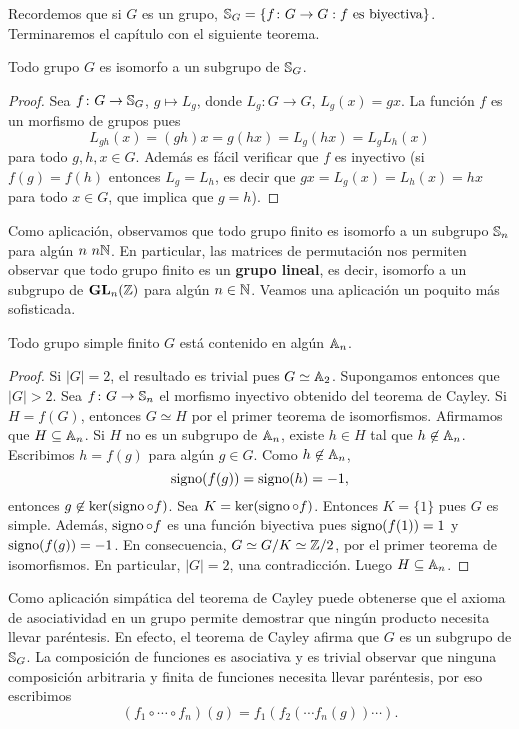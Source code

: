 Recordemos que si $G$ es un grupo, $\mathbb{S}_G=\{f\colon G\to G:f\text{ es biyectiva}\}$. 
Terminaremos el capítulo con el siguiente teorema.

\begin{theorem}[Cayley]
Todo grupo $G$ es isomorfo a un subgrupo de $\mathbb{S}_G$. 
\end{theorem}

\begin{proof}
Sea $f\colon G\to\mathbb{S}_G$, $g\mapsto L_g$, donde $L_g\colon G\to G$, $L_g(x)=gx$. La función $f$ es un morfismo de grupos pues
\[
L_{gh}(x)=(gh)x=g(hx)=L_g(hx)=L_gL_h(x)
\]
para todo $g,h,x\in G$. Además es fácil verificar que $f$ es inyectivo (si $f(g)=f(h)$ entonces $L_g=L_h$, es decir que 
$gx=L_g(x)=L_h(x)=hx$ para todo $x\in G$, que implica que $g=h$). 
\end{proof}

Como aplicación, observamos que todo grupo finito es isomorfo a un subgrupo $\mathbb{S}_n$ para algún $n\ n\mathbb{N}$. En particular, las matrices de permutación nos permiten observar que
todo grupo finito es un \textbf{grupo lineal}, es decir, isomorfo a un subgrupo de $\mathbf{GL}_n(\mathbb{Z})$ para algún $n\in\mathbb{N}$. Veamos una aplicación un poquito más sofisticada.
  
\begin{proposition}
Todo grupo simple finito $G$ está contenido en algún $\mathbb{A}_n$.
\end{proposition}

\begin{proof}
Si $|G|=2$, el resultado es trivial pues $G\simeq\mathbb{A}_2$. Supongamos entonces que $|G|>2$.  
Sea $f\colon G\to\mathbb{S}_n$ el morfismo inyectivo obtenido del teorema de Cayley. Si $H=f(G)$, entonces $G\simeq H$ por el primer teorema de isomorfismos. Afirmamos que $H\subseteq\mathbb{A}_n$. Si   
$H$ no es un subgrupo de $\mathbb{A}_n$, existe $h\in H$ tal que $h\not\in\mathbb{A}_n$. Escribimos $h=f(g)$ para algún $g\in G$. Como $h\not\in\mathbb{A}_n$, 
\[
\operatorname{signo}(f(g))=\operatorname{signo}(h)=-1,
\]
entonces $g\not\in\ker(\operatorname{signo}\circ f)$. 
Sea $K=\ker(\operatorname{signo}\circ f)$. Entonces $K=\{1\}$ pues $G$ es simple. Además, $\operatorname{signo}\circ f$ es una función biyectiva pues $\operatorname{signo}(f(1))=1$ y $\operatorname{signo}(f(g))=-1$. En consecuencia,
$G\simeq G/K\simeq\mathbb{Z}/2$, por el primer teorema de isomorfismos.  En particular, $|G|=2$, una contradicción. Luego $H\subseteq\mathbb{A}_n$.        
\end{proof}	

Como aplicación simpática del teorema de Cayley puede obtenerse que el axioma de asociatividad en un grupo permite demostrar
que ningún producto necesita llevar paréntesis.  En efecto, el teorema de Cayley afirma que $G$ es un subgrupo de $\mathbb{S}_G$. 
La composición de funciones es asociativa y es trivial observar que ninguna composición arbitraria y finita de funciones necesita llevar paréntesis, por eso escribimos 
\[
(f_1\circ\cdots\circ f_n)(g)=f_1(f_2(\cdots f_n(g))\cdots).
\]

